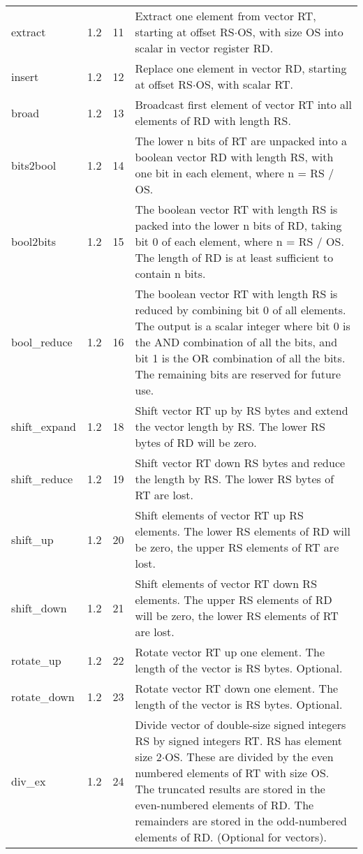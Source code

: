 \documentclass[forwardcom.tex]{subfiles}
\begin{document}
\begin{longtable} {|p{20mm}|p{10mm}|p{8mm}|p{75mm}|}
extract       & 1.2 & 11 & Extract one element from vector RT, starting at offset RS$\cdot$OS, with size OS into scalar in vector register RD. \\
insert        & 1.2 & 12 & Replace one element in vector RD, starting at offset RS$\cdot$OS, with scalar RT. \\
broad         & 1.2 & 13 & Broadcast first element of vector RT into all elements of RD with length RS. \\
bits2bool     & 1.2 & 14 & The lower n bits of RT are unpacked into a boolean vector RD with length RS, with one bit in each element, where n = RS / OS. \\
bool2bits     & 1.2 & 15 & The boolean vector RT with length RS is packed into the lower n bits of RD, taking bit 0 of each element, where n = RS / OS. The
length of RD is at least sufficient to contain n bits. \\
bool\_reduce  & 1.2 & 16 & The boolean vector RT with length RS is reduced by combining bit 0 of all elements. The output is a scalar integer where bit 0 is the
AND combination of all the bits, and bit 1 is the OR combination of
all the bits. The remaining bits are reserved for future use. \\
shift\_expand & 1.2 & 18 & Shift vector RT up by RS bytes and extend the vector length by RS. The lower RS bytes of RD will be zero. \\
shift\_reduce & 1.2 & 19 & Shift vector RT down RS bytes and reduce the length by RS. The lower RS bytes of RT are lost. \\
shift\_up     & 1.2 & 20 & Shift elements of vector RT up RS elements. The lower RS elements of RD will be zero, the upper RS elements of RT are lost. \\
shift\_down   & 1.2 & 21 & Shift elements of vector RT down RS elements. The upper RS
elements of RD will be zero, the lower RS elements of RT are lost. \\
rotate\_up  & 1.2 & 22 & Rotate vector RT up one element. The length of the vector is RS bytes. Optional. \\
rotate\_down  & 1.2 & 23 & Rotate vector RT down one element. The length of the vector is RS bytes. Optional. \\
div\_ex    & 1.2 & 24 & Divide vector of double-size signed integers RS by signed integers RT. RS has element size 2$\cdot$OS. These are divided by the even numbered
elements of RT with size OS. The truncated results are stored in
the even-numbered elements of RD. The remainders are stored in
the odd-numbered elements of RD. (Optional for vectors). \\

\end{longtable}
\end{document}
